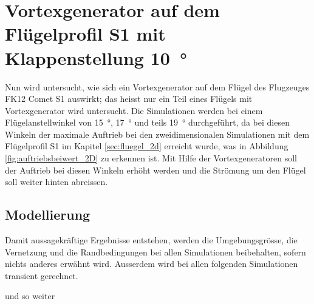 \section[Vortexgenerator auf dem Flügelprofil S1]{Vortexgenerator auf dem Flügelprofil S1 mit Klappenstellung \SI{10}{\degree}}
\label{sec:vortexgenerator_auf_fluegelprofil_s1_mit_klappe_10_grad}
Nun wird untersucht, wie sich ein Vortexgenerator auf dem Flügel des Flugzeuges FK12 Comet S1 auswirkt; das heisst nur ein Teil eines Flügels mit Vortexgenerator wird untersucht. Die Simulationen werden bei einem Flügelanstellwinkel von \SI{15}{\degree}, \SI{17}{\degree} und teils \SI{19}{\degree} durchgeführt, da bei diesen Winkeln der maximale Auftrieb bei den zweidimensionalen Simulationen mit dem Flügelprofil S1 im Kapitel \ref{sec:fluegel_2d} erreicht wurde, was in Abbildung \ref{fig:auftriebsbeiwert_2D} zu erkennen ist. Mit Hilfe der Vortexgeneratoren soll der Auftrieb bei diesen Winkeln erhöht werden und die Strömung um den Flügel soll weiter hinten abreissen. 


\subsection{Modellierung}
\label{subsec:modellierung_fluegel_s1}
Damit aussagekräftige Ergebnisse entstehen, werden die Umgebungsgrösse, die Vernetzung und die Randbedingungen bei allen Simulationen beibehalten, sofern nichts anderes erwähnt wird. Ausserdem wird bei allen folgenden Simulationen transient gerechnet.

und so weiter

